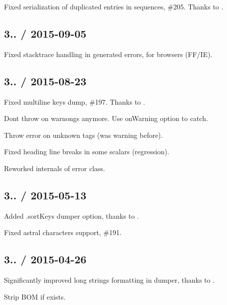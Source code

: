 
\begin{DoxyItemize}
\item Fixed serialization of duplicated entries in sequences, \#205. Thanks to .
\end{DoxyItemize}

\subsection*{3.. / 2015-\/09-\/05 }


\begin{DoxyItemize}
\item Fixed stacktrace handling in generated errors, for browsers (F\+F/\+I\+E).
\end{DoxyItemize}

\subsection*{3.. / 2015-\/08-\/23 }


\begin{DoxyItemize}
\item Fixed multiline keys dump, \#197. Thanks to .
\item Don\textquotesingle{}t throw on warnongs anymore. Use {\ttfamily on\+Warning} option to catch.
\item Throw error on unknown tags (was warning before).
\item Fixed heading line breaks in some scalars (regression).
\item Reworked internals of error class.
\end{DoxyItemize}

\subsection*{3.. / 2015-\/05-\/13 }


\begin{DoxyItemize}
\item Added {\ttfamily .sort\+Keys} dumper option, thanks to .
\item Fixed astral characters support, \#191.
\end{DoxyItemize}

\subsection*{3.. / 2015-\/04-\/26 }


\begin{DoxyItemize}
\item Significantly improved long strings formatting in dumper, thanks to .
\item Strip B\+O\+M if exists.
\end{DoxyItemize}

